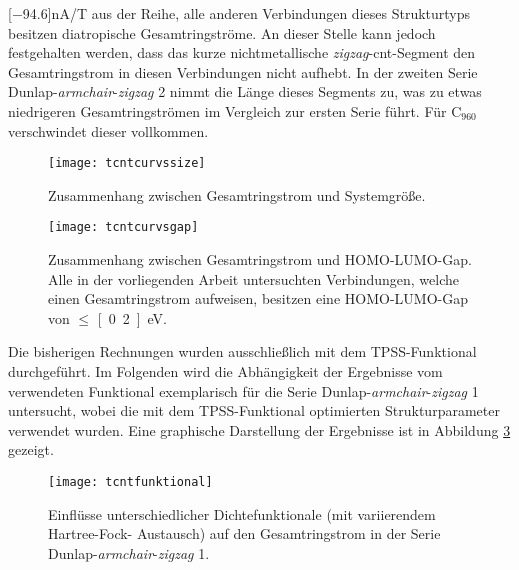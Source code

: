 \unit[$-$94.6]{nA/T} aus der Reihe, alle anderen Verbindungen dieses Strukturtyps besitzen diatropische Gesamtringströme. An dieser Stelle kann jedoch festgehalten werden, dass das kurze nichtmetallische \textit{zigzag}-\ac{cnt}-Segment den Gesamtringstrom in diesen Verbindungen nicht aufhebt. In der zweiten Serie \glqq Dunlap-\textit{armchair}-\textit{zigzag} 2\grqq{} nimmt die Länge dieses Segments zu, was zu etwas niedrigeren Gesamtringströmen im Vergleich zur ersten Serie führt. Für C$_{960}$ verschwindet dieser vollkommen. \\

\begin{figure}[ht!]
	\centering
	\texttt{[image: tcntcurvssize]}
	\captionsetup{figurewithin = chapter}
	\captionsetup{font=small, labelfont=bf}\caption[Zusammenhang zwischen Gesamtringstrom und Systemgröße]{Zusammenhang zwischen Gesamtringstrom und Systemgröße.}
\label{abb:tcntcurvssize}
\end{figure}
\vfill
\FloatBarrier
\newpage

\begin{figure}[ht!]
	\centering
	\texttt{[image: tcntcurvsgap]}
	\captionsetup{figurewithin = chapter}
	\captionsetup{font=small, labelfont=bf}\caption[Zusammenhang zwischen Gesamtringstrom und HOMO-LUMO-Gap]{Zusammenhang zwischen Gesamtringstrom und HOMO-LUMO-Gap. Alle in der vorliegenden Arbeit untersuchten Verbindungen, welche einen Gesamtringstrom aufweisen, besitzen eine HOMO-LUMO-Gap von $\leq$ \unit[0.2]{eV}.}
\label{abb:tcntcurvsgap}
\end{figure}
\FloatBarrier

Die bisherigen Rechnungen wurden ausschließlich mit dem TPSS-Funktional durchgeführt. Im Folgenden wird die Abhängigkeit der Ergebnisse vom verwendeten Funktional exemplarisch für die Serie \glqq Dunlap-\textit{armchair}-\textit{zigzag} 1\grqq{} untersucht, wobei die mit dem TPSS-Funktional optimierten Strukturparameter verwendet wurden. Eine graphische Darstellung der Ergebnisse ist in Abbildung \ref{abb:tcntfunktional} gezeigt. 

\begin{figure}[ht!]
	\centering
	\texttt{[image: tcntfunktional]}
	\captionsetup{figurewithin = chapter}
	\captionsetup{font=small, labelfont=bf}\caption[Funktionaleinflüsse auf Ringströme]{Einflüsse unterschiedlicher Dichtefunktionale (mit variierendem Hartree-Fock-
Austausch) auf den Gesamtringstrom in der Serie \glqq Dunlap-\textit{armchair}-\textit{zigzag} 1\grqq{}.}
\label{abb:tcntfunktional}
\end{figure}
\FloatBarrier

